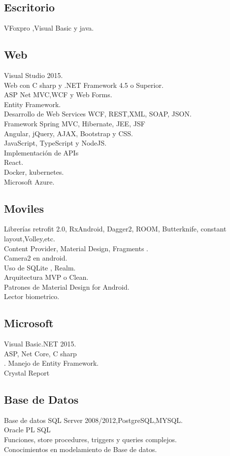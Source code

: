 \documentclass[10pt,fleqn,x11names,table]{article}
\begin{document}
\subsection{Escritorio}
VFoxpro ,Visual Basic y java.
\subsection{Web}
Visual Studio 2015.\\
Web con C sharp y .NET Framework 4.5 o Superior.\\
ASP Net MVC,WCF y Web Forms.\\
Entity Framework.\\
Desarrollo de Web Services WCF, REST,XML, SOAP, JSON.\\
Framework Spring MVC, Hibernate, JEE, JSF\\
Angular, jQuery, AJAX, Bootstrap y CSS.\\
JavaScript, TypeScript y NodeJS.\\
Implementación de APIs\\
React.\\
Docker, kubernetes.\\
Microsoft Azure.
\subsection{Moviles}
Librerías retrofit 2.0, RxAndroid, Dagger2, ROOM, Butterknife, constant layout,Volley,etc.\\
Content Provider, Material Design, Fragments .\\
Camera2 en android.\\
Uso de SQLite , Realm.\\
Arquitectura MVP o Clean.\\
Patrones de Material Design for Android.\\
Lector biometrico.
\subsection{Microsoft}
Visual Basic.NET 2015.\\
ASP, Net Core, C sharp\\.
Manejo de Entity Framework.\\
Crystal Report\\
\subsection{Base de Datos}
Base de datos SQL Server 2008/2012,PostgreSQL,MYSQL.\\
Oracle PL SQL \\
Funciones, store procedures, triggers y queries complejos.\\
Conocimientos en modelamiento de Base de datos.
\end{document}
